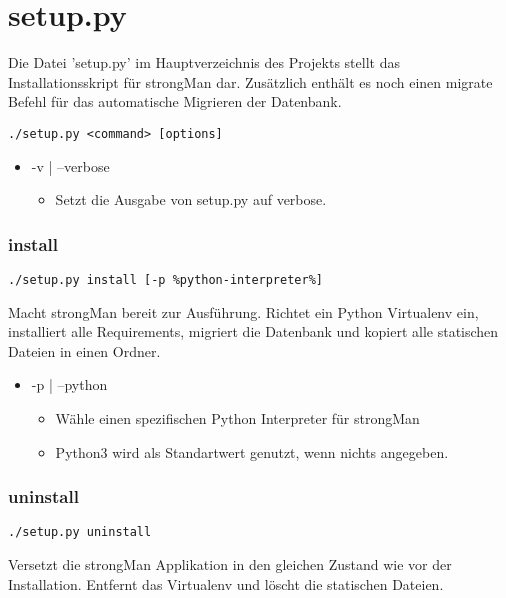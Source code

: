 \section{setup.py}
Die Datei 'setup.py' im Hauptverzeichnis des Projekts stellt das Installationsskript für strongMan dar. Zusätzlich enthält es noch einen migrate Befehl für das automatische Migrieren der Datenbank.

\begin{lstlisting}[style=BashInputStyle]
	 ./setup.py <command> [options]
\end{lstlisting}

\begin{itemize}
	\item -v | --verbose
	\begin{itemize}
	    \item Setzt die Ausgabe von setup.py auf verbose.
	\end{itemize}
\end{itemize}

\subsubsection{install}
\begin{lstlisting}[style=BashInputStyle]
	 ./setup.py install [-p %python-interpreter%]
\end{lstlisting}
Macht strongMan bereit zur Ausführung. Richtet ein Python Virtualenv ein, installiert alle Requirements, migriert die Datenbank und kopiert alle statischen Dateien in einen Ordner.
\begin{itemize}
	\item -p | --python %
	\begin{itemize}
	    \item Wähle einen spezifischen Python Interpreter für strongMan
	    \item Python3 wird als Standartwert genutzt, wenn nichts angegeben.
	\end{itemize}
\end{itemize}

\subsubsection{uninstall}
\begin{lstlisting}[style=BashInputStyle]
	 ./setup.py uninstall
\end{lstlisting}
Versetzt die strongMan Applikation in den gleichen Zustand wie vor der Installation. Entfernt das Virtualenv und löscht die statischen Dateien.

